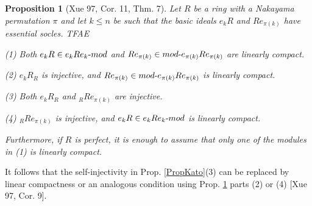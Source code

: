 \documentclass[11pt]{article}
\theoremstyle{plain}
\newtheorem{Prop}[veta]{Proposition}
\theoremstyle{remark}
\theoremstyle{plain}
\begin{document}
\begin{Prop}[Xue 97, Cor. 11, Thm. 7]\label{PropIpairsperfect}
Let $R$ be a ring with a Nakayama permutation $\pi$ and let $k\leq n$ be such that the basic ideals $e_kR$ and $Re_{\pi(k)}$ have essential socles. TFAE

(1) Both $e_kR\in e_kRe_k\text-mod$ and $Re_{\pi(k)}\in mod\text- e_{\pi(k)}Re_{\pi(k)}$ are linearly compact.

(2) $e_kR_R$ is injective, and $Re_{\pi(k)}\in mod\text- e_{\pi(k)}Re_{\pi(k)}$ is linearly compact.

(3) Both $e_kR_R$ and $_R Re_{\pi(k)}$ are injective.

(4) $_R Re_{\pi(k)}$ is injective, and $e_kR\in e_kRe_k\text-mod$ is linearly compact.

Furthermore, if $R$ is perfect, it is enough to assume that only one of the modules in (1) is linearly compact.     
\end{Prop}
It follows that the self-injectivity in Prop. \ref{PropKato}(3) can be replaced by linear compactness or an analogous condition using Prop. \ref{PropIpairsperfect} parts (2) or (4) [Xue 97, Cor. 9].
\end{document}
